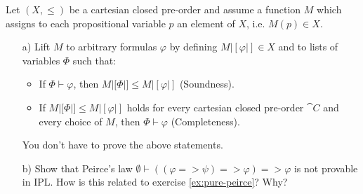 \begin{exercise}
    Let $(X, \le)$ be a cartesian closed pre-order and assume a function $M$ which assigns to each propositional variable $p$ an element of $X$, i.e. $M(p) \in X$.
    \begin{itemize}
        \item[a)] Lift $M$ to arbitrary formulas $\varphi$ by defining $M|[\varphi|] \in X$ and to lists of variables $\Phi$ such that:
            \begin{itemize}
                \item If $\Phi \vdash \varphi$, then $M|[\Phi|] \le M|[\varphi|]$ (Soundness).
                \item If $M|[\Phi|] \le M|[\varphi|]$ holds for every cartesian closed pre-order $\cat{C}$ and every choice of $M$, then $\Phi \vdash \varphi$ (Completeness).
            \end{itemize}
            You don't have to prove the above statements.
        \item[b)] Show that Peirce's law $\emptyset \vdash ((\varphi => \psi) => \varphi) => \varphi$ is not provable in IPL.
            How is this related to exercise \ref{ex:pure-peirce}? Why?
    \end{itemize}
\end{exercise}
